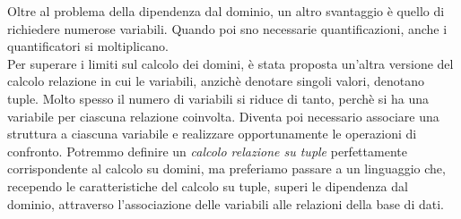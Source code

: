 \documentclass[12pt]{report}
\begin{document}
 	Oltre al problema della dipendenza dal dominio, un altro svantaggio è quello di richiedere numerose variabili. Quando poi sno necessarie quantificazioni, anche i quantificatori si moltiplicano. \\
 	Per superare i limiti sul calcolo dei domini, è stata proposta un'altra versione del calcolo relazione in cui le variabili, anzichè denotare singoli valori, denotano tuple. Molto spesso il numero di variabili si riduce di tanto, perchè si ha una variabile per ciascuna relazione coinvolta. Diventa poi necessario associare una struttura a ciascuna variabile e realizzare opportunamente le operazioni di confronto. Potremmo definire un \textit{calcolo relazione su tuple} perfettamente corrispondente al calcolo su domini, ma preferiamo passare a un linguaggio che, recependo le caratteristiche del calcolo su tuple, superi le dipendenza dal dominio, attraverso l'associazione delle variabili alle relazioni della base di dati.
\end{document}
